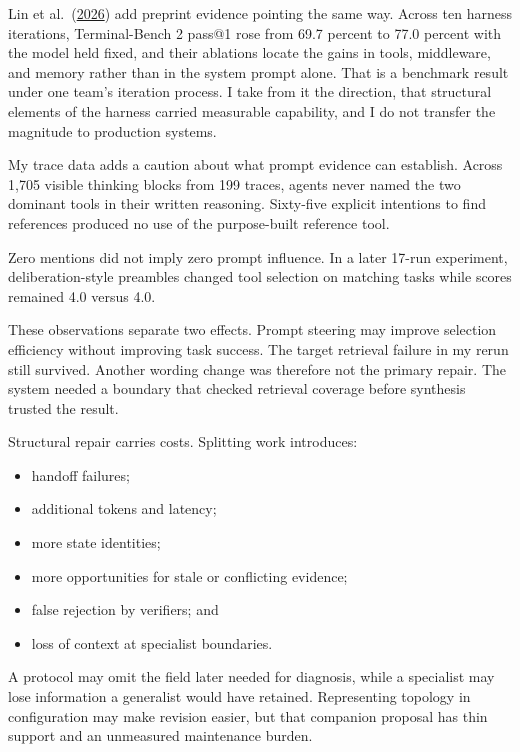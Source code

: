 Lin et al.~(\href{https://arxiv.org/abs/2604.25850}{2026}) add preprint evidence pointing the same way. Across ten harness iterations, Terminal-Bench 2 pass@1 rose from 69.7 percent to 77.0 percent with the model held fixed, and their ablations locate the gains in tools, middleware, and memory rather than in the system prompt alone. That is a benchmark result under one team's iteration process. I take from it the direction, that structural elements of the harness carried measurable capability, and I do not transfer the magnitude to production systems.

My trace data adds a caution about what prompt evidence can establish. Across 1,705 visible thinking blocks from 199 traces, agents never named the two dominant tools in their written reasoning. Sixty-five explicit intentions to find references produced no use of the purpose-built reference tool.

Zero mentions did not imply zero prompt influence. In a later 17-run experiment, deliberation-style preambles changed tool selection on matching tasks while scores remained 4.0 versus 4.0.

These observations separate two effects. Prompt steering may improve selection efficiency without improving task success. The target retrieval failure in my rerun still survived. Another wording change was therefore not the primary repair. The system needed a boundary that checked retrieval coverage before synthesis trusted the result.


Structural repair carries costs. Splitting work introduces:

\begin{itemize}
\tightlist
\item
  handoff failures;
\item
  additional tokens and latency;
\item
  more state identities;
\item
  more opportunities for stale or conflicting evidence;
\item
  false rejection by verifiers; and
\item
  loss of context at specialist boundaries.
\end{itemize}

A protocol may omit the field later needed for diagnosis, while a specialist may lose information a generalist would have retained. Representing topology in configuration may make revision easier, but that companion proposal has thin support and an unmeasured maintenance burden.

